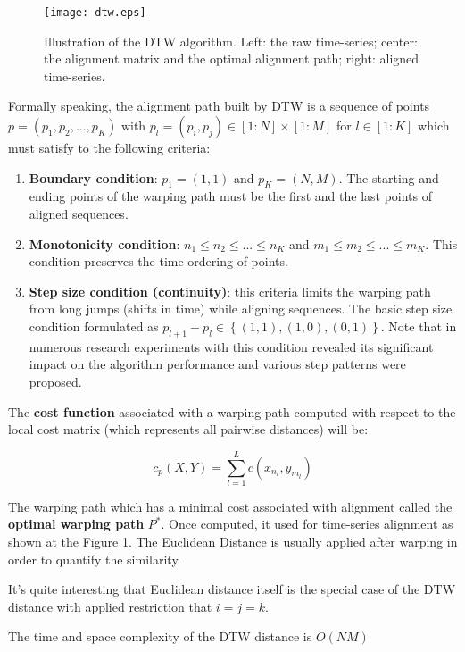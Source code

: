 \begin{figure}[tbp]
   \centering
   \texttt{[image: dtw.eps]}
   \caption{Illustration of the DTW algorithm. Left: the raw time-series; center: the alignment matrix and the optimal alignment path; right: aligned time-series.}
   \label{fig:dtw}
\end{figure} 

Formally speaking, the alignment path built by DTW is a sequence of points $p=(p_{1}, p_{2}, ... , p_{K})$ with $p_{l} = (p_{i}, p_{j}) \in [1:N] \times [1:M]$ for $l \in [1:K]$ which must satisfy to the following criteria:
\begin{enumerate}
	\item \textbf{Boundary condition}: $p_{1}=(1,1)$ and $p_{K}=(N,M)$. The starting and ending points of the warping path must be the first and the last points of aligned sequences.
	\item \textbf{Monotonicity condition}: $n_{1} \leq n_{2} \leq ... \leq n_{K}$ and $m_{1} \leq m_{2} \leq ... \leq m_{K}$. This condition preserves the time-ordering of points.
	\item \textbf{Step size condition (continuity)}: this criteria limits the warping path from long jumps (shifts in time) while aligning sequences. The basic step size condition formulated as $p_{l+1}-p_{l} \in \left\{ (1,1), (1,0), (0,1) \right\}$. Note that in numerous research \cite{citeulike:3496861} \cite{citeulike:3578001} \cite{citeulike:603020} \cite{citeulike:3577984} experiments with this condition revealed its significant impact on the algorithm performance and various step patterns were proposed.
\end{enumerate}

The \textbf{cost function} associated with a warping path computed with respect to the local cost matrix (which represents all pairwise distances) will be: 

\begin{equation}
\label{eq:pathcost}
c_{p}(X,Y) = \sum_{l=1}^{L} c(x_{n_{l}}, y_{m_{l}})
\end{equation}

The warping path which has a minimal cost associated with alignment called the \textbf{optimal warping path} $P^{*}$. Once computed, it used for time-series alignment as shown at the Figure \ref{fig:dtw}. The Euclidean Distance is usually applied after warping in order to quantify the similarity.

It's quite interesting that Euclidean distance itself is the special case of the DTW distance with applied restriction that $i=j=k$.

The time and space complexity of the DTW distance is $O(NM)$
